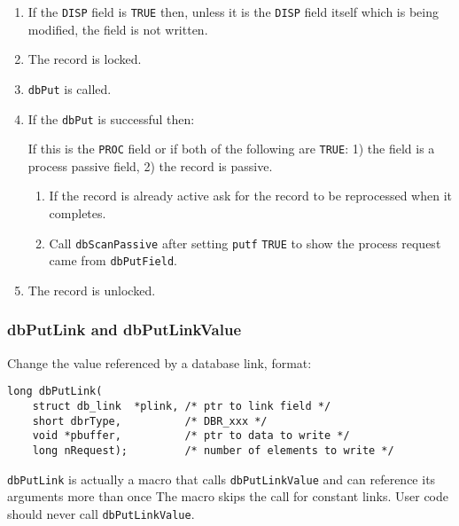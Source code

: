 \begin{enumerate}
\item If the \verb|DISP| field is \verb|TRUE| then, unless it is the \verb|DISP| field itself which is being modified, the field is not written.

\item The record is locked.

\item \verb|dbPut| is called.

\item If the \verb|dbPut| is successful then:

If this is the \verb|PROC| field or if both of the following are \verb|TRUE|: 1) the field is a process passive field, 2) the record is 
passive.

\begin{enumerate}

\item If the record is already active ask for the record to be reprocessed when it completes.

\item Call \verb|dbScanPassive| after setting \verb|putf| \verb|TRUE| to show the process request came from \verb|dbPutField|.

\end{enumerate}

\item The record is unlocked.

\end{enumerate}

\subsubsection{dbPutLink and dbPutLinkValue}

Change the value referenced by a database link, format:

\begin{verbatim}
long dbPutLink(
    struct db_link  *plink, /* ptr to link field */
    short dbrType,          /* DBR_xxx */
    void *pbuffer,          /* ptr to data to write */
    long nRequest);         /* number of elements to write */
\end{verbatim}

\verb|dbPutLink| is actually a macro that calls \verb|dbPutLinkValue| and can reference its arguments more than once The 
macro skips the call for constant links. User code should never call \verb|dbPutLinkValue|.

